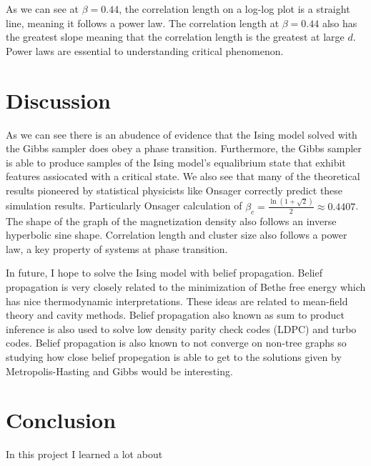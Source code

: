 \documentclass{article}
\begin{document}
As we can see at $\beta=0.44$, the correlation length on a log-log plot is a straight line, meaning it follows
a power law. The correlation length at $\beta = 0.44$ also has the greatest slope meaning that the correlation length
is the greatest at large $d$.
Power laws are essential to understanding critical phenomenon. 


\section{Discussion}
As we can see there is an abudence of evidence that the Ising model solved with the Gibbs sampler does obey a phase transition. Furthermore,
the Gibbs sampler is able to produce samples of the Ising model's equalibrium state that exhibit features assiocated with a critical state. 
We also see that many of the theoretical results pioneered by statistical physicists like Onsager correctly predict these simulation results. 
Particularly Onsager calculation of $\beta_c = \frac{\ln(1+\sqrt{2})}{2} \approx 0.4407 $. The shape of the graph of the magnetization density also 
follows an inverse hyperbolic sine shape. Correlation length and cluster size also follows a power law, a key property of systems at phase transition.

In future, I hope to solve the Ising model with belief propagation. Belief propagation is very closely related to the minimization of Bethe free energy
which has nice thermodynamic interpretations. These ideas are related to mean-field theory and cavity methods. Belief propagation also known as sum to product inference is also used to solve low density parity check codes (LDPC)
and turbo codes. Belief propagation is also known to not converge on non-tree graphs so studying how close belief propegation is able to get to the solutions given 
by Metropolis-Hasting and Gibbs would be interesting.

\section{Conclusion}
In this project I learned a lot about 



\end{document}
